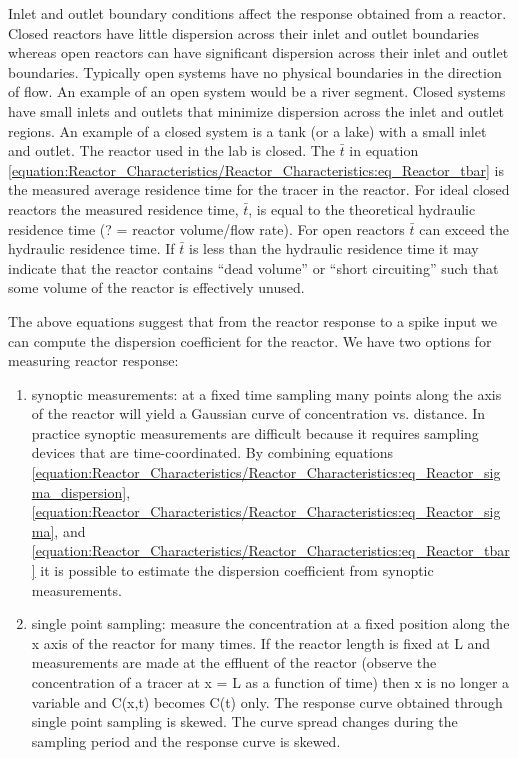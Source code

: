 \documentclass[letterpaper,10pt,english]{sphinxmanual}
\begin{document}
Inlet and outlet boundary conditions affect the response obtained from a reactor. Closed reactors have little dispersion across their inlet and outlet boundaries whereas open reactors can have significant dispersion across their inlet and outlet boundaries. Typically open systems have no physical boundaries in the direction of flow. An example of an open system would be a river segment. Closed systems have small inlets and outlets that minimize dispersion across the inlet and outlet regions. An example of a closed system is a tank (or a lake) with a small inlet and outlet. The reactor used in the lab is closed. The \(\bar{t}\) in equation \eqref{equation:Reactor_Characteristics/Reactor_Characteristics:eq_Reactor_tbar} is the measured average residence time for the tracer in the reactor. For ideal closed reactors the measured residence time, \(\bar{t}\), is equal to the theoretical hydraulic residence time (? = reactor volume/flow rate). For open reactors \(\bar{t}\) can exceed the hydraulic residence time. If \(\bar{t}\) is less than the hydraulic residence time it may indicate that the reactor contains “dead volume” or “short circuiting” such that some volume of the reactor is effectively unused.

The above equations suggest that from the reactor response to a spike input we can compute the dispersion coefficient for the reactor. We have two options for measuring reactor response:
\begin{enumerate}
\item {} 
synoptic measurements: at a fixed time sampling many points along the axis of the reactor will yield a Gaussian curve of concentration vs. distance. In practice synoptic measurements are difficult because it requires sampling devices that are time-coordinated. By combining equations \eqref{equation:Reactor_Characteristics/Reactor_Characteristics:eq_Reactor_sigma_dispersion}, \eqref{equation:Reactor_Characteristics/Reactor_Characteristics:eq_Reactor_sigma}, and \eqref{equation:Reactor_Characteristics/Reactor_Characteristics:eq_Reactor_tbar} it is possible to estimate the dispersion coefficient from synoptic measurements.

\item {} 
single point sampling: measure the concentration at a fixed position along the x axis of the reactor for many times. If the reactor length is fixed at L and measurements are made at the effluent of the reactor (observe the concentration of a tracer at x = L as a function of time) then x is no longer a variable and C(x,t) becomes C(t) only. The response curve obtained through single point sampling is skewed. The curve spread changes during the sampling period and the response curve is skewed.

\end{enumerate}
\end{document}
